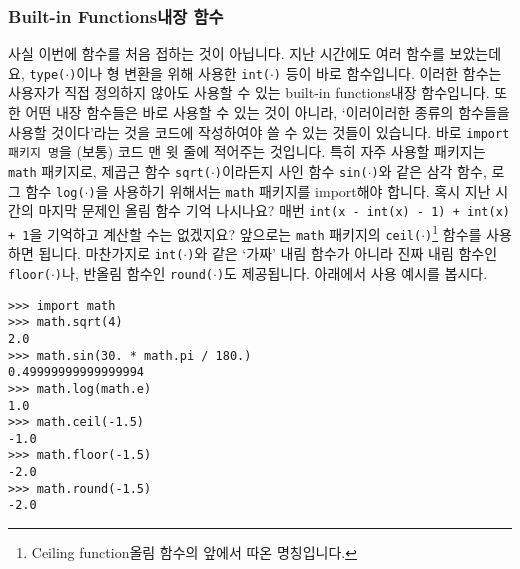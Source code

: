 \documentclass[../main.tex]{subfiles}
\begin{document}
\subsubsection{Built-in Functions내장 함수}
사실 이번에 함수를 처음 접하는 것이 아닙니다.
지난 시간에도 여러 함수를 보았는데요, \texttt{type($\cdot$)}이나 형 변환을 위해 사용한 \texttt{int($\cdot$)} 등이 바로 함수입니다.
이러한 함수는 사용자가 직접 정의하지 않아도 사용할 수 있는 built-in functions내장 함수입니다.
또한 어떤 내장 함수들은 바로 사용할 수 있는 것이 아니라, `이러이러한 종류의 함수들을 사용할 것이다'라는 것을 코드에 작성하여야 쓸 수 있는 것들이 있습니다.
바로 \texttt{import 패키지 명}을 (보통) 코드 맨 윗 줄에 적어주는 것입니다.
특히 자주 사용할 패키지는 \texttt{math} 패키지로, 제곱근 함수 \texttt{sqrt($\cdot$)}이라든지 사인 함수 \texttt{sin($\cdot$)}와 같은 삼각 함수, 로그 함수 \texttt{log($\cdot$)}을 사용하기 위해서는  \texttt{math} 패키지를 import해야 합니다.
혹시 지난 시간의 마지막 문제인 올림 함수 기억 나시나요?
매번 \texttt{int(x - int(x) - 1) + int(x) + 1}을 기억하고 계산할 수는 없겠지요?
앞으로는 \texttt{math} 패키지의 \texttt{ceil($\cdot$)}\footnote{Ceiling function올림 함수의 앞에서 따온 명칭입니다.} 함수를 사용하면 됩니다.
마찬가지로 \texttt{int($\cdot$)}와 같은 `가짜' 내림 함수가 아니라 진짜 내림 함수인 \texttt{floor($\cdot$)}나, 반올림 함수인 \texttt{round($\cdot$)}도 제공됩니다.
아래에서 사용 예시를 봅시다.
\begin{verbatim}
>>> import math
>>> math.sqrt(4)
2.0
>>> math.sin(30. * math.pi / 180.)
0.49999999999999994
>>> math.log(math.e)
1.0
>>> math.ceil(-1.5)
-1.0
>>> math.floor(-1.5)
-2.0
>>> math.round(-1.5)
-2.0
\end{verbatim}
\end{document}

